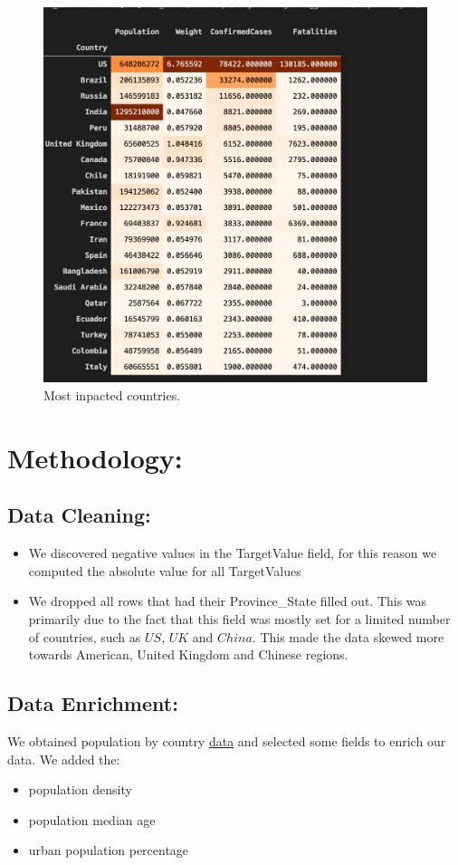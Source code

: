 \documentclass{article}
\begin{document}
\begin{figure}
  \centering
  \includegraphics[width=\columnwidth]{covid_top_n_countries.png}
  \caption{Most inpacted countries.}
\end{figure}
\section{Methodology:}
\subsection{Data Cleaning:}
\begin{itemize}
\item We discovered negative values in the TargetValue field, for this reason we computed the absolute value for all TargetValues
\item We dropped all rows that had their Province\_State filled out. This was primarily due to the fact that this field was mostly set for a limited number of countries, such as $US$, $UK$ and $China$. This made the data skewed more towards American, United Kingdom and Chinese regions. 
\end{itemize}
\subsection{Data Enrichment:}
We obtained population by country \href{https://github.com/acquayefrank/MLDM2020-Project/blob/master/data/population_by_country_2020.csv}{data} and selected some fields to enrich our data.
We added the:
\begin{itemize}
  \item  population density
  \item  population median age
  \item  urban population  percentage
\end{itemize}
\end{document}
